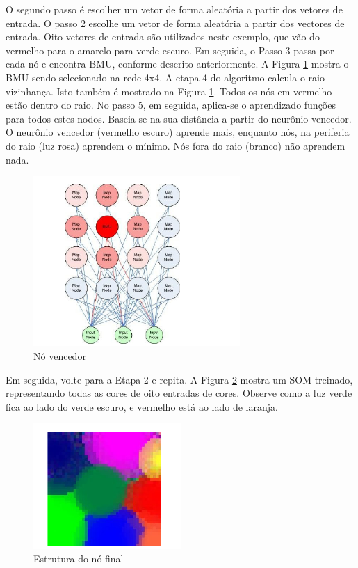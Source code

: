 O segundo passo é escolher um vetor de forma aleatória a partir dos vetores de entrada.
O passo 2 escolhe um vetor de forma aleatória a partir dos vectores de entrada. Oito vetores de entrada
são utilizados neste exemplo, que vão do vermelho para o amarelo para verde escuro. Em seguida,
o Passo 3 passa por cada nó e encontra BMU, conforme descrito anteriormente. A Figura \ref{fig:bmu-node}
mostra o BMU sendo selecionado na rede 4x4. A etapa 4 do
algoritmo calcula o raio vizinhança. Isto também é mostrado na Figura \ref{fig:bmu-node}. Todos
os nós em vermelho estão dentro do raio. No passo 5, em seguida, aplica-se o aprendizado
funções para todos estes nodos. Baseia-se na sua distância a partir do neurônio vencedor. O
neurônio vencedor (vermelho escuro) aprende mais, enquanto nós, na periferia do raio (luz
rosa) aprendem o mínimo. Nós fora do raio (branco) não aprendem nada.

\begin{figure}[ht]
\centering
\includegraphics[width=0.7\textwidth]{imgs/node-bmu.png}
\caption{Nó vencedor}
\label{fig:bmu-node}
\end{figure}

Em seguida, volte para a Etapa 2 e repita. A Figura \ref{fig:final-node} mostra um SOM treinado,
representando todas as cores de oito entradas de cores. Observe como a luz verde fica ao lado do verde escuro,
e vermelho está ao lado de laranja.

\begin{figure}[ht]
\centering
\includegraphics[width=0.5\textwidth]{imgs/final-node.png}
\caption{Estrutura do nó final}
\label{fig:final-node}
\end{figure}